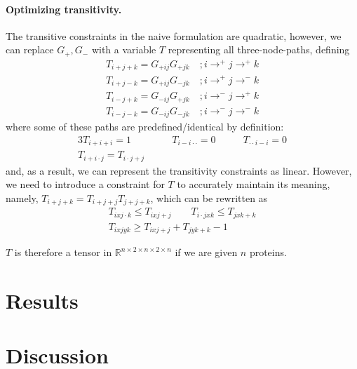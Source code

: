 \documentclass{article}
\begin{document}
\paragraph{Optimizing transitivity.}
The transitive constraints in the na\:ive formulation are quadratic, however, we can replace $G_+, G_-$ with a variable $T$ representing all three-node-paths, defining
\begin{align}
 T_{i+j+k} = G_{+ij} G_{+jk} \quad; i \rightarrow^+ j \rightarrow^+ k \\
 T_{i+j-k} = G_{+ij} G_{-jk} \quad; i \rightarrow^+ j \rightarrow^- k \\
 T_{i-j+k} = G_{-ij} G_{+jk} \quad; i \rightarrow^- j \rightarrow^+ k \\
 T_{i-j-k} = G_{-ij} G_{-jk} \quad; i \rightarrow^- j \rightarrow^- k
\end{align}
where some of these paths are predefined/identical by definition:
\begin{alignat}{3}
 T_{i+i+i} = 1 \qquad & T_{i-i \cdot \cdot} = 0 \qquad & T_{ \cdot \cdot i - i } = 0 \\
 T_{i+i \cdot j} = T_{i \cdot j+j} \qquad &
\end{alignat}
and, as a result, we can represent the transitivity constraints as linear.
However, we need to introduce a constraint for $T$ to accurately maintain its meaning, namely, $T_{i+j+k} = T_{i+j+j} T_{j+j+k}$, which can be rewritten as
\begin{gather}
  T_{i x j \cdot k} \leq T_{i x j+j} \qquad T_{i \cdot j x k} \leq T_{j x k + k} \\
  T_{i x j y k} \geq T_{i x j + j} + T_{j y k + k} - 1
\end{gather}

$T$ is therefore a tensor in $\mathbb R^{n \times 2 \times n \times 2 \times n}$ if we are given $n$ proteins.

\section{Results}

\section{Discussion}

\printbibliography
\end{document}
